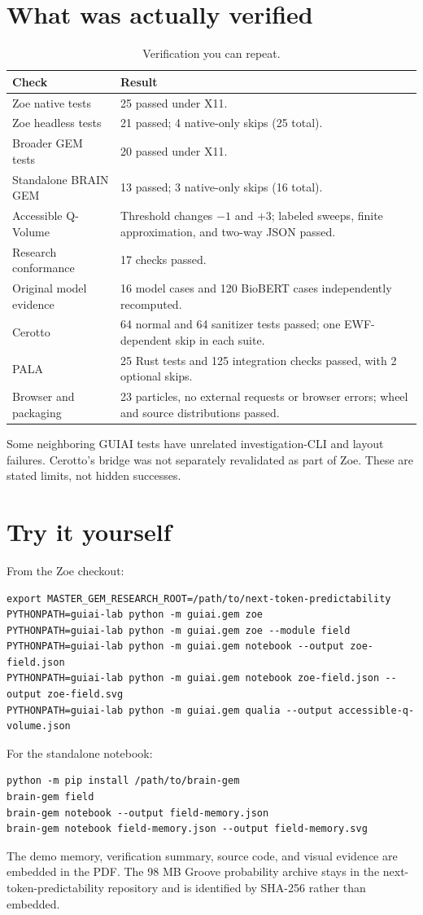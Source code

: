 \documentclass[11pt,a4paper]{article}
\begin{document}
\section{What was actually verified}
\begin{table}[htbp]
\centering
\caption{Verification you can repeat.}
\begin{tabular}{p{4.5cm}p{8cm}}
\toprule
Check & Result \\
\midrule
Zoe native tests & 25 passed under X11. \\
Zoe headless tests & 21 passed; 4 native-only skips (25 total). \\
Broader GEM tests & 20 passed under X11. \\
Standalone BRAIN GEM & 13 passed; 3 native-only skips (16 total). \\
Accessible Q-Volume & Threshold changes $-1$ and $+3$; labeled sweeps, finite approximation, and two-way JSON passed. \\
Research conformance & 17 checks passed. \\
Original model evidence & 16 model cases and 120 BioBERT cases independently recomputed. \\
Cerotto & 64 normal and 64 sanitizer tests passed; one EWF-dependent skip in each suite. \\
PALA & 25 Rust tests and 125 integration checks passed, with 2 optional skips. \\
Browser and packaging & 23 particles, no external requests or browser errors; wheel and source distributions passed. \\
\bottomrule
\end{tabular}
\end{table}

Some neighboring GUIAI tests have unrelated investigation-CLI and layout failures. Cerotto's bridge was not separately revalidated as part of Zoe. These are stated limits, not hidden successes.

\section{Try it yourself}
From the Zoe checkout:
\begin{lstlisting}
export MASTER_GEM_RESEARCH_ROOT=/path/to/next-token-predictability
PYTHONPATH=guiai-lab python -m guiai.gem zoe
PYTHONPATH=guiai-lab python -m guiai.gem zoe --module field
PYTHONPATH=guiai-lab python -m guiai.gem notebook --output zoe-field.json
PYTHONPATH=guiai-lab python -m guiai.gem notebook zoe-field.json --output zoe-field.svg
PYTHONPATH=guiai-lab python -m guiai.gem qualia --output accessible-q-volume.json
\end{lstlisting}
For the standalone notebook:
\begin{lstlisting}
python -m pip install /path/to/brain-gem
brain-gem field
brain-gem notebook --output field-memory.json
brain-gem notebook field-memory.json --output field-memory.svg
\end{lstlisting}
The demo memory, verification summary, source code, and visual evidence are embedded in the PDF. The 98 MB Groove probability archive stays in the next-token-predictability repository and is identified by SHA-256 rather than embedded.
\end{document}
